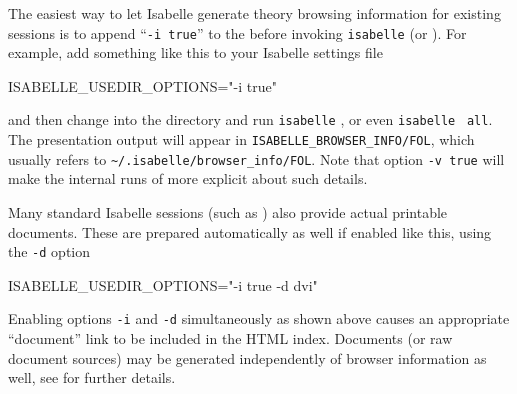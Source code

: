 \begin{isabellebody}
\begin{isamarkuptext}
  \medskip

  The easiest way to let Isabelle generate theory browsing information
  for existing sessions is to append ``\verb|-i true|'' to the
  \hyperlink{setting.ISABELLE-USEDIR-OPTIONS}{\mbox{}} before invoking \verb|isabelle| \hyperlink{tool.make}{\mbox{}} (or \hyperlink{file.$ISABELLE-HOME/build}{\mbox{}}).  For
  example, add something like this to your Isabelle settings file

\begin{ttbox}
ISABELLE_USEDIR_OPTIONS="-i true"
\end{ttbox}

  and then change into the \hyperlink{file.~~/src/FOL}{\mbox{}} directory and run
  \verb|isabelle| \hyperlink{tool.make}{\mbox{}}, or even \verb|isabelle| \hyperlink{tool.make}{\mbox{}}~\verb|all|.  The presentation output will appear in
  \verb|ISABELLE_BROWSER_INFO/FOL|, which usually refers to
  \verb|~/.isabelle/browser_info/FOL|.  Note that option
  \verb|-v true| will make the internal runs of \hyperlink{tool.usedir}{\mbox{}}
  more explicit about such details.

  Many standard Isabelle sessions (such as \hyperlink{file.~~/src/HOL/ex}{\mbox{}})
  also provide actual printable documents.  These are prepared
  automatically as well if enabled like this, using the \verb|-d| option
\begin{ttbox}
ISABELLE_USEDIR_OPTIONS="-i true -d dvi"
\end{ttbox}
  Enabling options \verb|-i| and \verb|-d|
  simultaneously as shown above causes an appropriate ``document''
  link to be included in the HTML index.  Documents (or raw document
  sources) may be generated independently of browser information as
  well, see  for further details.


\end{isamarkuptext}
\end{isabellebody}
